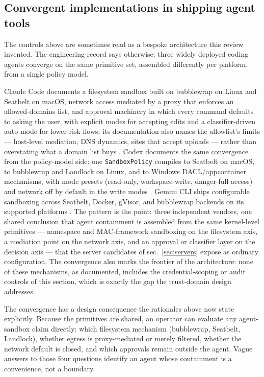\documentclass[
  english,
  9pt,
]{extarticle}
\newcounter{none} %
\begin{document}
\subsection{Convergent implementations in shipping agent
tools}\label{convergent-implementations-in-shipping-agent-tools}

The controls above are sometimes read as a bespoke architecture this
review invented. The engineering record says otherwise: three widely
deployed coding agents converge on the same primitive set, assembled
differently per platform, from a single policy model.

Claude Code documents a filesystem sandbox built on bubblewrap on Linux
and Seatbelt on macOS, network access mediated by a proxy that enforces
an allowed-domains list, and approval machinery in which every command
defaults to asking the user, with explicit modes for accepting edits and
a classifier-driven auto mode for lower-risk flows; its documentation
also names the allowlist's limits --- host-level mediation, DNS
dynamics, sites that accept uploads --- rather than overstating what a
domain list buys \citep{anthropic_sandboxing, claude_code_auto_mode}.
Codex documents the same convergence from the policy-model side: one
\texttt{SandboxPolicy} compiles to Seatbelt on macOS, to bubblewrap and
Landlock on Linux, and to Windows DACL/appcontainer mechanisms, with
mode presets (read-only, workspace-write, danger-full-access) and
network off by default in the write modes \citep{codex_sandboxing}.
Gemini CLI ships configurable sandboxing across Seatbelt, Docker,
gVisor, and bubblewrap backends on its supported platforms
\citep{gemini_cli_sandbox}. The pattern is the point: three independent
vendors, one shared conclusion that agent containment is assembled from
the same kernel-level primitives --- namespace and MAC-framework
sandboxing on the filesystem axis, a mediation point on the network
axis, and an approval or classifier layer on the decision axis --- that
the server candidates of sec.~\ref{sec:servers} expose as ordinary
configuration. The convergence also marks the frontier of the
architecture: none of these mechanisms, as documented, includes the
credential-scoping or audit controls of this section, which is exactly
the gap the trust-domain design addresses.

The convergence has a design consequence the rationales above now state
explicitly. Because the primitives are shared, an operator can evaluate
any agent-sandbox claim directly: which filesystem mechanism
(bubblewrap, Seatbelt, Landlock), whether egress is proxy-mediated or
merely filtered, whether the network default is closed, and which
approvals remain outside the agent. Vague answers to those four
questions identify an agent whose containment is a convenience, not a
boundary.
\end{document}
